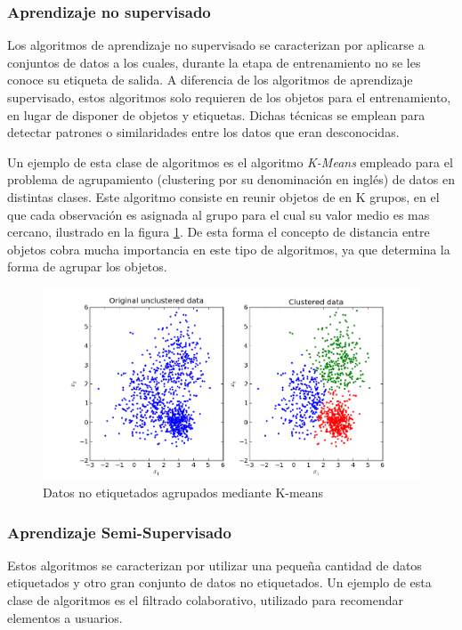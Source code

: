 \documentclass[a4paper,11pt,spanish]{book}
\begin{document}
      \subsubsection{Aprendizaje no supervisado}
	  Los algoritmos de aprendizaje no supervisado se caracterizan por aplicarse a conjuntos de datos a los cuales, durante la etapa de entrenamiento no se les conoce 
	  su etiqueta de salida. 
	  A diferencia de los algoritmos de aprendizaje supervisado, estos algoritmos solo requieren de los objetos para el entrenamiento, en lugar de disponer
	  de objetos y etiquetas. Dichas técnicas se emplean para detectar patrones o similaridades entre los datos que eran desconocidas.

	  Un ejemplo de esta clase de algoritmos es el algoritmo \emph{K-Means} empleado para el problema de agrupamiento (clustering por su denominación en inglés) de datos 
	  en distintas clases.
	  Este algoritmo consiste en reunir objetos de en K grupos, en el que cada observación es asignada al grupo para el cual su valor medio es mas cercano, 
	  ilustrado en la figura \ref{fig:clustering}.
	  De esta forma el concepto de distancia entre objetos cobra mucha importancia en este tipo de algoritmos, ya que determina la forma de agrupar los objetos.

	  \begin{figure}[H]
	    \includegraphics[scale=0.5]{./img/stackoverflow_clustering.png}
	    \caption{Datos no etiquetados agrupados mediante K-means}
	    \label{fig:clustering}
	  \end{figure}

      \subsubsection{Aprendizaje Semi-Supervisado}
	Estos algoritmos se caracterizan por utilizar una pequeña cantidad de datos etiquetados y otro gran conjunto de datos no etiquetados. 
	Un ejemplo de esta clase de algoritmos es el filtrado colaborativo, utilizado para recomendar elementos a usuarios.
\end{document}
